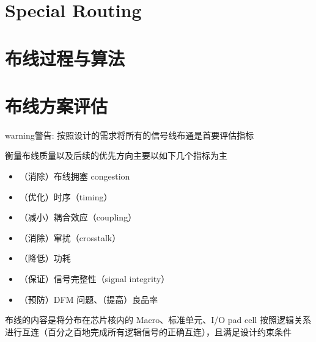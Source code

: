 \documentclass[letterpaper,10pt,english]{sphinxmanual}
\begin{document}
\section{Special Routing}
\label{\detokenize{chapter8/special_routing:special-routing}}\label{\detokenize{chapter8/special_routing::doc}}

\section{布线过程与算法}
\label{\detokenize{chapter8/_u5e03_u7ebf_u8fc7_u7a0b_u4e0e_u7b97_u6cd5:id1}}\label{\detokenize{chapter8/_u5e03_u7ebf_u8fc7_u7a0b_u4e0e_u7b97_u6cd5::doc}}

\section{布线方案评估}
\label{\detokenize{chapter8/_u5e03_u7ebf_u65b9_u6848_u8bc4_u4f30:id1}}\label{\detokenize{chapter8/_u5e03_u7ebf_u65b9_u6848_u8bc4_u4f30::doc}}
\begin{sphinxadmonition}{warning}{警告:}
\sphinxAtStartPar
按照设计的需求将所有的信号线布通是首要评估指标
\end{sphinxadmonition}

\sphinxAtStartPar
衡量布线质量以及后续的优先方向主要以如下几个指标为主
\begin{itemize}
\item {} 
\sphinxAtStartPar
（消除）布线拥塞 congestion

\item {} 
\sphinxAtStartPar
（优化）时序（timing）

\item {} 
\sphinxAtStartPar
（减小）耦合效应（coupling）

\item {} 
\sphinxAtStartPar
（消除）窜扰（crosstalk）

\item {} 
\sphinxAtStartPar
（降低）功耗

\item {} 
\sphinxAtStartPar
（保证）信号完整性（signal integrity）

\item {} 
\sphinxAtStartPar
（预防）DFM 问题、（提高）良品率

\end{itemize}

\sphinxAtStartPar
布线的内容是将分布在芯片核内的 Macro、标准单元、I/O pad cell 按照逻辑关系进行互连（百分之百地完成所有逻辑信号的正确互连），且满足设计约束条件



\renewcommand{\indexname}{索引}
\printindex
\end{document}
